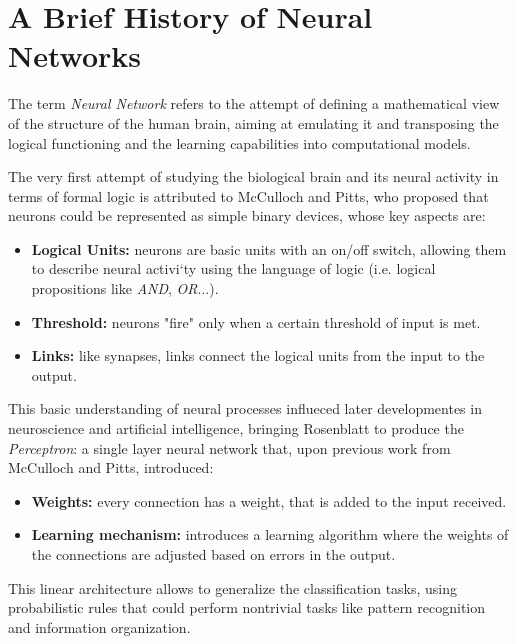 
\section{A Brief History of Neural Networks}

The term \textit{Neural Network} refers to the attempt of defining a mathematical view of the structure of the human brain, aiming at emulating it and transposing the logical functioning and the learning capabilities into computational models.

The very first attempt of studying the biological brain and its neural activity in terms of formal logic is attributed to McCulloch and Pitts,\cite{mcculloch1943logical} who proposed that neurons could be represented as simple binary devices, whose key aspects are:

\begin{itemize}
    \item \textbf{Logical Units:} neurons are basic units with an on/off switch, allowing them to describe neural activi`ty using the language of logic (i.e. logical propositions like \textit{AND}, \textit{OR}...).
    \item \textbf{Threshold:} neurons "fire" only when a certain threshold of input is met.
    \item \textbf{Links:} like synapses, links connect the logical units from the input to the output.
\end{itemize}

This basic understanding of neural processes influeced later developmentes in neuroscience and artificial intelligence, bringing Rosenblatt to produce the \textit{Perceptron}: a single layer neural network that, upon previous work from McCulloch and Pitts, introduced:

\begin{itemize}
    \item \textbf{Weights:} every connection has a weight, that is added to the input received.
    \item \textbf{Learning mechanism:} introduces a learning algorithm where the weights of the connections are adjusted based on errors in the output.
\end{itemize}

This linear architecture allows to generalize the classification tasks, using probabilistic rules that could perform nontrivial tasks like pattern recognition and information organization.

